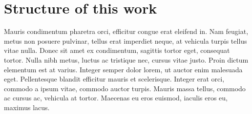 \section{Structure of this work}
Mauris condimentum pharetra orci, efficitur congue erat eleifend in. Nam feugiat, metus non posuere pulvinar, tellus erat imperdiet neque, at vehicula turpis tellus vitae nulla. Donec sit amet ex condimentum, sagittis tortor eget, consequat tortor. Nulla nibh metus, luctus ac tristique nec, cursus vitae justo. Proin dictum elementum est at varius. Integer semper dolor lorem, ut auctor enim malesuada eget. Pellentesque blandit efficitur mauris et scelerisque. Integer erat orci, commodo a ipsum vitae, commodo auctor turpis. Mauris massa tellus, commodo ac cursus ac, vehicula at tortor. Maecenas eu eros euismod, iaculis eros eu, maximus lacus.


